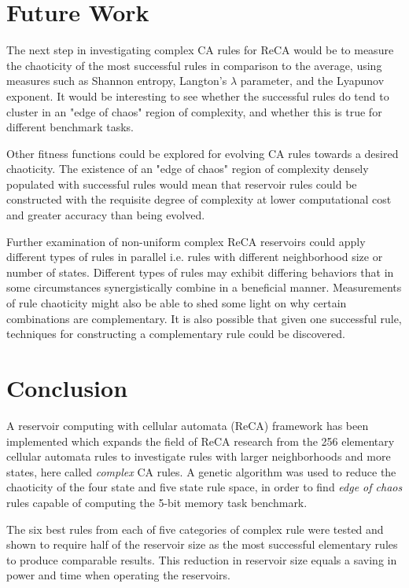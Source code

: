 \documentclass{elsarticle}
\begin{document}
\begin{multicols}{2}
\section{Future Work}\label{future_work}
The next step in investigating complex CA rules for ReCA would be to measure 
the chaoticity of the most successful rules in comparison to the average, using 
measures such as Shannon entropy, Langton's $\lambda$ parameter, and the 
Lyapunov exponent. It would be interesting to see whether the successful rules 
do tend to cluster in an "edge of chaos" region of complexity, and whether this
is true for different benchmark tasks. \par Other fitness functions could be 
explored for evolving CA rules towards a desired chaoticity. The existence of 
an "edge of chaos" region of complexity densely populated with successful rules 
would mean that reservoir rules could be constructed with the requisite degree 
of complexity at lower computational cost and greater accuracy than being 
evolved.  \par Further examination of non-uniform complex ReCA reservoirs could 
apply different types of rules in parallel i.e.  rules with different 
neighborhood size or number of states.  Different types of rules may exhibit 
differing behaviors that in some circumstances synergistically combine in a 
beneficial manner.  Measurements of rule chaoticity might also be able to shed 
some light on why certain combinations are complementary. It is also possible 
that given one successful rule, techniques for constructing a complementary 
rule could be discovered.

\fi
\section{Conclusion}\label{conclusion}
A reservoir computing with cellular automata (ReCA) framework has been 
implemented which expands the field of ReCA research from the 256 elementary 
cellular automata rules to investigate rules with larger neighborhoods and more 
states, here called \textit{complex} CA rules. A genetic algorithm was used to 
reduce the chaoticity of the four state and five state rule space, in order to 
find \textit{edge of chaos} rules capable of computing the 5-bit memory task 
benchmark. \par The six best rules from each of five categories of complex rule 
were tested and shown to require half of the reservoir size as the most 
successful elementary rules to produce comparable results. This reduction in 
reservoir size equals a saving in power and time when operating the reservoirs.




\end{multicols}
\end{document}
